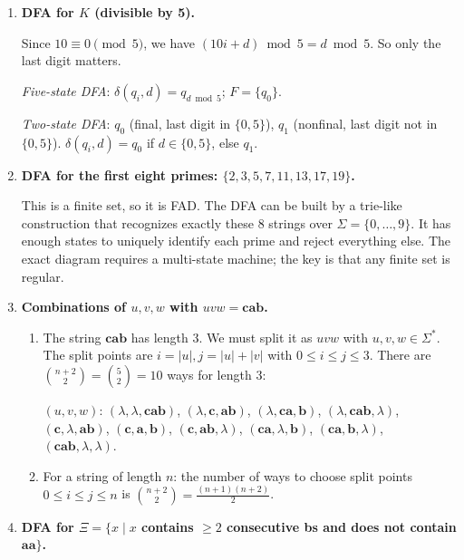 \documentclass[11pt]{book}
\begin{document}
\begin{enumerate}[{1.}1.]
\item \textbf{DFA for $K$ (divisible by 5).}

Since $10\equiv 0\pmod 5$, we have $(10i+d)\bmod 5 = d\bmod 5$. So only the last digit matters.

\textit{Five-state DFA}: $\delta(q_i,d) = q_{d\bmod 5}$; $F=\{q_0\}$.

\textit{Two-state DFA}: $q_0$ (final, last digit in $\{0,5\}$), $q_1$ (nonfinal, last digit not in $\{0,5\}$). $\delta(q_i,d)=q_0$ if $d\in\{0,5\}$, else $q_1$.

\item \textbf{DFA for the first eight primes: $\{2,3,5,7,11,13,17,19\}$.}

This is a finite set, so it is FAD. The DFA can be built by a trie-like construction that recognizes exactly these 8 strings over $\Sigma=\{0,\ldots,9\}$. It has enough states to uniquely identify each prime and reject everything else. The exact diagram requires a multi-state machine; the key is that any finite set is regular.

\item \textbf{Combinations of $u,v,w$ with $uvw = \mathbf{cab}$.}

\begin{enumerate}
\item The string $\mathbf{cab}$ has length 3. We must split it as $uvw$ with $u,v,w\in\Sigma^*$. The split points are $i=|u|,j=|u|+|v|$ with $0\leq i\leq j\leq 3$. There are $\binom{n+2}{2}=\binom{5}{2}=10$ ways for length 3:

$(u,v,w)$: $(\lambda,\lambda,\mathbf{cab})$, $(\lambda,\mathbf{c},\mathbf{ab})$, $(\lambda,\mathbf{ca},\mathbf{b})$, $(\lambda,\mathbf{cab},\lambda)$, $(\mathbf{c},\lambda,\mathbf{ab})$, $(\mathbf{c},\mathbf{a},\mathbf{b})$, $(\mathbf{c},\mathbf{ab},\lambda)$, $(\mathbf{ca},\lambda,\mathbf{b})$, $(\mathbf{ca},\mathbf{b},\lambda)$, $(\mathbf{cab},\lambda,\lambda)$.

\item For a string of length $n$: the number of ways to choose split points $0\leq i\leq j\leq n$ is $\binom{n+2}{2} = \frac{(n+1)(n+2)}{2}$.
\end{enumerate}

\item \textbf{DFA for $\Xi = \{x\mid x$ contains $\geq 2$ consecutive \textbf{b}s and does not contain $\mathbf{aa}\}$.}


\end{enumerate}
\end{document}
